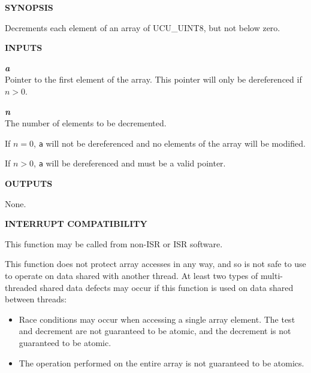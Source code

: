 \noindent\textbf{SYNOPSIS}
\begin{list}{}{\setlength{\leftmargin}{0.25in}\setlength{\topsep}{0.0in}}
\item Decrements each element of an array of UCU\_UINT8, but not below zero.
\end{list}
\vspace{2.8ex}

\noindent\textbf{INPUTS}
\begin{list}{}{\setlength{\leftmargin}{0.5in}\setlength{\itemindent}{-0.25in}\setlength{\topsep}{0.0in}\setlength{\partopsep}{0.0in}}
\item \emph{\textbf{a}}\\
      Pointer to the first element of the array.  This pointer will only
      be dereferenced if $n>0$.
\item \emph{\textbf{n}}\\
      The number of elements to be decremented.

      If $n=0$, \texttt{a} will not be
      dereferenced and no elements of the array will be modified.

      If $n>0$, \texttt{a}
      will be dereferenced and must be a valid pointer.
\end{list}
\vspace{2.8ex}

\noindent\textbf{OUTPUTS}
\begin{list}{}{\setlength{\leftmargin}{0.25in}\setlength{\topsep}{0.0in}}
\item None.
\end{list}
\vspace{2.8ex}

\noindent\textbf{INTERRUPT COMPATIBILITY}
\begin{list}{}{\setlength{\leftmargin}{0.25in}\setlength{\topsep}{0.0in}}
\item This function may be called from non-ISR or ISR software.
\item This function does not protect array accesses in any way, and so
      is not safe to use to operate on data shared with another thread.
      At least two types of multi-threaded shared data defects may occur if
      this function is used on data shared between threads:
      \begin{itemize}
      \item Race conditions may occur when accessing a single array element.
            The test and decrement are not guaranteed to be atomic, and
            the decrement is not guaranteed to be atomic.
      \item The operation performed on the entire array is not guaranteed
            to be atomics.
      \end{itemize}
\end{list}
\vspace{2.8ex}

